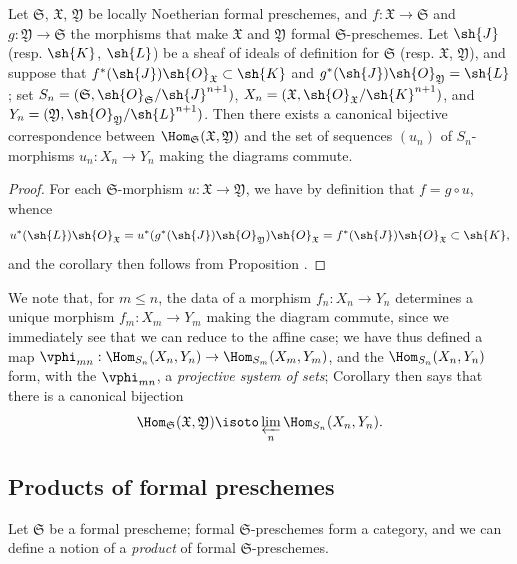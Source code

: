 \begin{corollary}[10.6.11]
\label{I.10.6.11}
Let $\mathfrak{S}$, $\mathfrak{X}$, $\mathfrak{Y}$ be locally Noetherian formal preschemes, and $f:\mathfrak{X}\to\mathfrak{S}$ and $g:\mathfrak{Y}\to\mathfrak{S}$ the morphisms that make $\mathfrak{X}$ and $\mathfrak{Y}$ formal $\mathfrak{S}$-preschemes.
Let $\sh{J}$ (resp. $\sh{K}$, $\sh{L}$) be a sheaf of ideals of definition for $\mathfrak{S}$ (resp. $\mathfrak{X}$, $\mathfrak{Y}$), and suppose that $f^*(\sh{J})\sh{O}_\mathfrak{X}\subset\sh{K}$ and $g^*(\sh{J})\sh{O}_\mathfrak{Y}=\sh{L}$; set $S_n=(\mathfrak{S},\sh{O}_\mathfrak{S}/\sh{J}^{n+1})$, $X_n=(\mathfrak{X},\sh{O}_\mathfrak{X}/\sh{K}^{n+1})$, and $Y_n=(\mathfrak{Y},\sh{O}_\mathfrak{Y}/\sh{L}^{n+1})$.
Then there exists a canonical bijective correspondence
between $\Hom_\mathfrak{S}(\mathfrak{X},\mathfrak{Y})$ and the set of sequences $(u_n)$ of $S_n$-morphisms $u_n:X_n\to Y_n$ making the diagrams  commute.
\end{corollary}

\begin{proof}
For each $\mathfrak{S}$-morphism $u:\mathfrak{X}\to\mathfrak{Y}$, we have by definition that $f=g\circ u$, whence
\[
  u^*(\sh{L})\sh{O}_\mathfrak{X}=u^*(g^*(\sh{J})\sh{O}_\mathfrak{Y})\sh{O}_\mathfrak{X}=f^*(\sh{J})\sh{O}_\mathfrak{X}\subset\sh{K},
\]
and the corollary then follows from Proposition .
\end{proof}

We note that, for $m\leq n$, the data of a morphism $f_n:X_n\to Y_n$ determines a unique morphism $f_m:X_m\to Y_m$ making the diagram  commute, since we immediately see that we can reduce to the affine case; we have thus defined a map $\vphi_{mn}:\Hom_{S_n}(X_n,Y_n)\to\Hom_{S_m}(X_m,Y_m)$, and the $\Hom_{S_n}(X_n,Y_n)$ form, with the $\vphi_{mn}$, a \emph{projective system of sets}; Corollary  then says that there is a canonical bijection
\[
  \Hom_\mathfrak{S}(\mathfrak{X},\mathfrak{Y})\isoto\varprojlim_n\Hom_{S_n}(X_n,Y_n).
\]

\subsection{Products of formal preschemes}
\label{subsection:I.10.7}

\begin{env}[10.7.1]
\label{I.10.7.1}
Let $\mathfrak{S}$ be a formal prescheme; formal $\mathfrak{S}$-preschemes form a category, and we can define a notion of a \emph{product} of formal $\mathfrak{S}$-preschemes.
\end{env}

